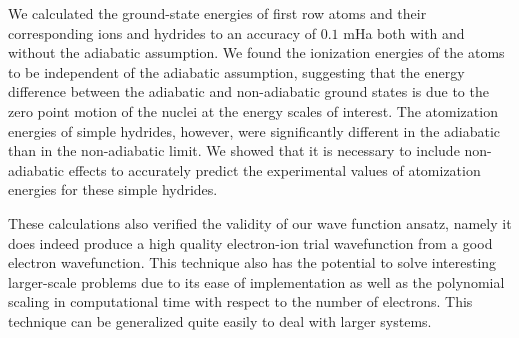 We calculated the ground-state energies of first row atoms and their corresponding ions and hydrides to an accuracy of $0.1$ mHa both with and without the adiabatic assumption. We found the ionization energies of the atoms to be independent of the adiabatic assumption, suggesting that the energy difference between the adiabatic and non-adiabatic ground states is due to the zero point motion of the nuclei at the energy scales of interest. The atomization energies of simple hydrides, however, were significantly different in the adiabatic than in the non-adiabatic limit.   We showed that it is necessary to include non-adiabatic effects to accurately predict the experimental values of atomization energies for these simple hydrides.

These calculations also verified the validity of our wave function ansatz, namely it does indeed produce a high quality electron-ion trial wavefunction from a good electron wavefunction. This technique also has the potential to solve interesting larger-scale problems due to its ease of implementation as well as the polynomial scaling in computational time with respect to the number of electrons.  This technique can be generalized quite easily to deal with larger systems.